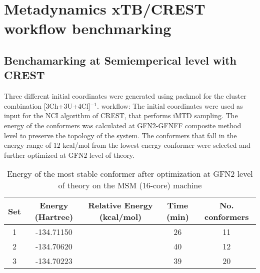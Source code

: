 \section{Metadynamics xTB/CREST workflow benchmarking}
\label{sec:meta_benchmark}
\subsection{Benchamarking at Semiemperical level with CREST}
Three different initial coordinates were generated using packmol for the cluster combination
[3Ch+3U+4Cl]$^{-1}$.
workflow:
The initial coordinates were used as input for the NCI algorithm of CREST, that performs iMTD sampling.
The energy of the conformers was calculated at GFN2-GFNFF composite method level to preserve the topology of the system.
The conformers that fall in the energy range of 12 kcal/mol from the lowest energy conformer were selected and further optimized at GFN2 level of theory.
\begin{table}
\centering
\begin{tabular}{|c|c|c|c|c|} \hline
\textbf{Set} & \textbf{Energy (Hartree)} & \textbf{Relative Energy (kcal/mol)}&\textbf{Time (min)} & \textbf{No. conformers} \\ \hline
1 & -134.71150 & & 26 & 11\\ \hline
2 & -134.70620 & & 40 & 12 \\ \hline
3 & -134.70223 & & 39 & 20\\ \hline
\end{tabular}
\caption{Energy of the most stable conformer after optimization at GFN2 level of theory on the MSM (16-core) machine}
\end{table}

